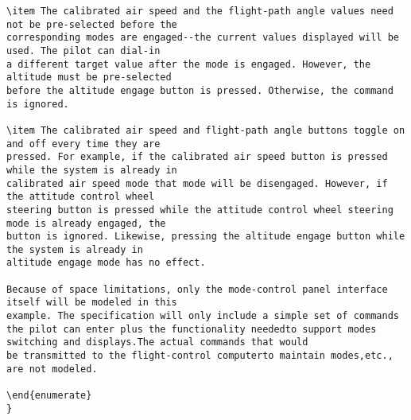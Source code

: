 \begin{verbatim}
\item The calibrated air speed and the flight-path angle values need not be pre-selected before the
corresponding modes are engaged--the current values displayed will be used. The pilot can dial-in
a different target value after the mode is engaged. However, the altitude must be pre-selected
before the altitude engage button is pressed. Otherwise, the command is ignored.

\item The calibrated air speed and flight-path angle buttons toggle on and off every time they are
pressed. For example, if the calibrated air speed button is pressed while the system is already in
calibrated air speed mode that mode will be disengaged. However, if the attitude control wheel
steering button is pressed while the attitude control wheel steering mode is already engaged, the
button is ignored. Likewise, pressing the altitude engage button while the system is already in
altitude engage mode has no effect.

Because of space limitations, only the mode-control panel interface itself will be modeled in this
example. The specification will only include a simple set of commands the pilot can enter plus the functionality neededto support modes switching and displays.The actual commands that would
be transmitted to the flight-control computerto maintain modes,etc., are not modeled.

\end{enumerate}
}

\end{verbatim}